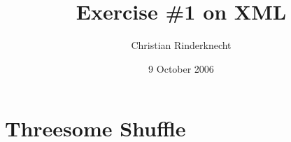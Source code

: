 \documentclass[11pt,a4paper]{article}
\title{Exercise \#1 on XML}
\author{Christian Rinderknecht}
\date{9 October 2006}
\begin{document}
\maketitle
\thispagestyle{empty}

\section{Threesome Shuffle}



\end{document}

